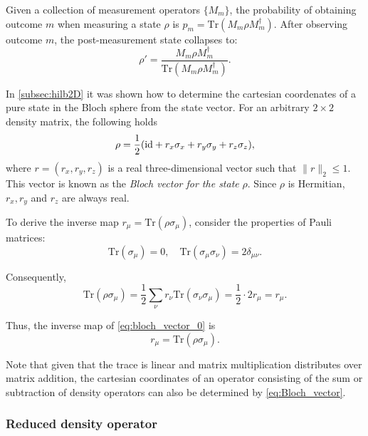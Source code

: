 \begin{definition}
  Given a collection of measurement operators \( \{M_m\} \), the probability of obtaining outcome \( m \) when measuring a state \( \rho \) is $p_m = \text{Tr}(M_m \rho M_m^\dagger).$
  After observing outcome $ m $, the post-measurement state collapses to:
  \[
  \rho' = \frac{M_m \rho M_m^\dagger}{\text{Tr}(M_m \rho M_m^\dagger)}.
  \]
\end{definition}


\begin{definition}
  In \autoref{subsec:hilb2D} it was shown how to determine the cartesian coordenates of a pure state in the Bloch sphere from the state vector. For an arbitrary $2 \times 2$ density matrix, the following holds
\begin{equation} \label{eq:bloch_vector_0}
  \rho = \frac{1}{2}(\mathrm{id} + r_{x}\sigma_{x} + r_{y}\sigma_{y} + r_{z}\sigma_{z}),
\end{equation}
where $r = (r_x, r_y, r_z)$ is a real three-dimensional vector such that $\| r \|_2 \leq 1$. This vector is known as the \emph{Bloch vector for the state} $\rho$. Since $\rho$ is Hermitian, $r_x, r_y$ and $r_z$ are always real.  

To derive the inverse map \( r_\mu = \text{Tr}(\rho \sigma_\mu) \), consider the properties of Pauli matrices:
\[
\text{Tr}(\sigma_\mu) = 0, \quad \text{Tr}(\sigma_\mu \sigma_\nu) = 2 \delta_{\mu \nu}.
\]

Consequently,
\[
\text{Tr}(\rho \sigma_\mu) = \frac{1}{2} \sum_{\nu} r_\nu \text{Tr}(\sigma_\nu \sigma_\mu) = \frac{1}{2} \cdot 2 r_\mu = r_\mu.
\]

Thus, the inverse map of \autoref{eq:bloch_vector_0} is
\begin{equation}
  \label{eq:Bloch_vector}
  r_{\mu} = \text{Tr}(\rho \sigma_{\mu}).
  \end{equation} 
\end{definition}


  Note that given that the trace is linear and matrix multiplication distributes over matrix addition, the cartesian coordinates of an operator consisting of the sum or subtraction of density operators can also be determined by \autoref{eq:Bloch_vector}.

\subsubsection{Reduced density operator}

